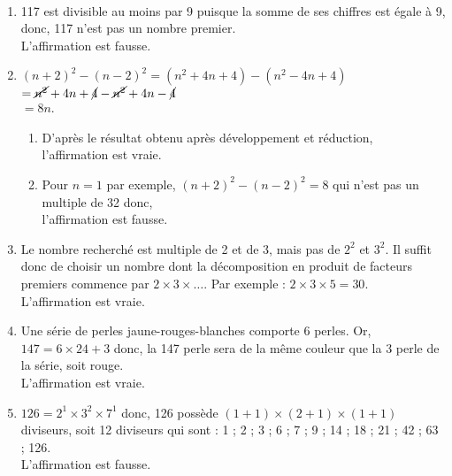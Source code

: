 \ \\ [-5mm]
\begin{enumerate}
   \item 117 est divisible au moins par 9 puisque la somme de ses chiffres est égale à 9, donc, 117 n'est pas un nombre premier. \\
      {\blue L'affirmation est fausse}.
   \item
      $(n+2)^2 - (n-2)^2 =(n^2+4n+4)-(n^2-4n+4)$ \\
      \hspace*{3.15cm} $=\cancel{n^2}+4n+\cancel{4}-\cancel{n^2}+4n-\cancel{4}$ \\
      \hspace*{3.15cm} $=8n$. \\
      \begin{enumerate}
         \item D'après le résultat obtenu après développement et réduction, \\
            {\blue l'affirmation est vraie}.
         \item Pour $n =1$ par exemple, $(n+2)^2 - (n-2)^2 =8$ qui n'est pas un multiple de 32 donc, \\
            {\blue l'affirmation est fausse}.
      \end{enumerate}
   \setcounter{enumi}{2}
   \item Le nombre recherché est multiple de 2 et de 3, mais pas de $2^2$ et $3^2$. Il suffit donc de choisir un nombre dont la décomposition en produit de facteurs premiers commence par $2\times3\times\dots$. Par exemple : $2\times3\times5 =30$. \\
      {\blue L'affirmation est vraie}.
   \item Une série de perles \og jaune-rouges-blanches \fg{} comporte 6 perles. Or, $147 =6\times24+3$ donc, la 147 perle sera de la même couleur que la 3 perle de la série, soit rouge. \\
      {\blue L'affirmation est vraie}.
   \item $126 =2^1\times3^2\times7^1$ donc, 126 possède $(1+1)\times(2+1)\times(1+1)$ diviseurs, soit 12 diviseurs qui sont : 1 ; 2 ; 3 ; 6 ; 7 ; 9 ; 14 ; 18 ; 21 ; 42 ; 63 ; 126. \\
      {\blue L'affirmation est fausse}.
\end{enumerate}
